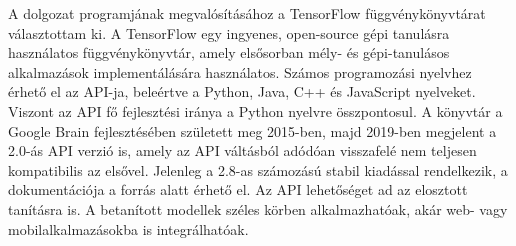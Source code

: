 




A dolgozat programjának megvalósításához a TensorFlow függvénykönyvtárat választottam ki. A TensorFlow egy ingyenes, open-source gépi tanulásra használatos függvénykönyvtár, amely elsősorban mély- és gépi-tanulásos alkalmazások implementálására használatos. Számos programozási nyelvhez érhető el az API-ja, beleértve a Python, Java, C++ és JavaScript nyelveket. Viszont az API fő fejlesztési iránya a Python nyelvre összpontosul. A könyvtár a Google Brain fejlesztésében született meg 2015-ben, majd 2019-ben megjelent a 2.0-ás API verzió is, amely az API váltásból adódóan visszafelé nem teljesen kompatibilis az elsővel. Jelenleg a 2.8-as számozású stabil kiadással rendelkezik, a dokumentációja a \cite{tensorflow} forrás alatt érhető el. Az API lehetőséget ad az elosztott tanításra is. A betanított modellek széles körben alkalmazhatóak, akár web- vagy mobilalkalmazásokba is integrálhatóak. 

